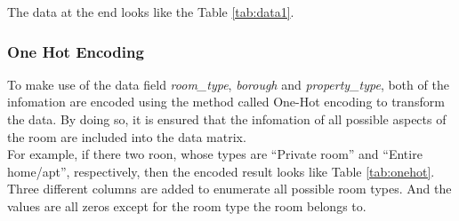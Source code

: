 \documentclass[12pt]{article}
\begin{document}
\begin{table}[h]
    \caption{Data After preprocessing}
    \label{tab:data1}
\end{table}
The data at the end looks like the Table \ref{tab:data1}.\\
\subsubsection{One Hot Encoding}
To make use of the data field \textit{room\_type}, \textit{borough} and \textit{property\_type}, both of the infomation are encoded using the method called One-Hot encoding to transform the data. By doing so, it is ensured that the infomation of all possible aspects of the room are included into the data matrix.\\
For example, if there two roon, whose types are ``Private room'' and ``Entire home/apt'', respectively, then the encoded result looks like Table \ref{tab:onehot}. Three different columns are added to enumerate all possible room types. And the values are all zeros except for the room type the room belongs to.
\begin{table}[h]
\caption{Example Data After One-hot Encoding}
    \label{tab:onehot}
\end{table}
\end{document}
